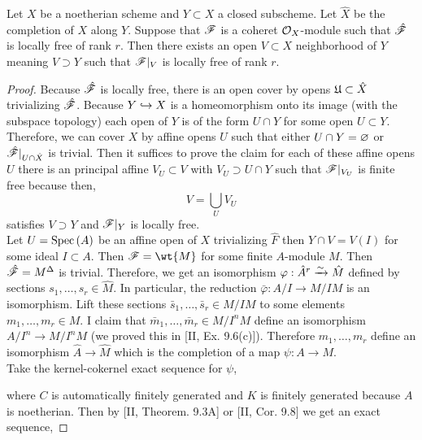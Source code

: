 \documentclass[12pt]{article}
\begin{document}
\begin{enumerate}
\begin{prop}
Let $X$ be a noetherian scheme and $Y \subset X$ a closed subscheme. Let $\hat{X}$ be the completion of $X$ along $Y$. Suppose that $\mathscr{F}$ is a coheret $\mathcal{O}_{X}$-module such that $\hat{\mathscr{F}}$ is locally free of rank $r$. Then there exists an open $V \subset X$ neighborhood of $Y$ meaning $V \supset Y$ such that $\mathscr{F}|_V$ is locally free of rank $r$.
\end{prop}

\begin{proof}
Because $\hat{\mathscr{F}}$ is locally free, there is an open cover by opens $\mathfrak{U} \subset \hat{X}$ trivializing $\hat{\mathscr{F}}$. Because $Y \hookrightarrow X$ is a homeomorphism onto its image (with the subspace topology) each open of $Y$ is of the form $U \cap Y$ for some open $U \subset Y$. Therefore, we can cover $X$ by affine opens $U$ such that either $U \cap Y = \varnothing$ or $\hat{\mathscr{F}} |_{U \cap \hat{X}}$ is trivial. Then it suffices to prove the claim for each of these affine opens $U$ there is an principal affine $V_U \subset V$ with $V_U \supset U \cap Y$ such that $\mathscr{F} |_{V_U}$ is finite free because then,
\[ V = \bigcup_{U} V_U \]
satisfies $V \supset Y$ and $\mathscr{F} |_Y$ is locally free. 
\bigskip\\
Let $U = \mathrm{Spec}\left( A \right)$ be an affine open of $X$ trivializing $\hat{F}$ then $Y \cap V = V(I)$ for some ideal $I \subset A$. Then $\F = \wt{M}$ for some finite $A$-module $M$. Then $\hat{\mathscr{F}} = M^\Delta$ is trivial. Therefore, we get an isomorphism $\varphi : \hat{A}^r \xrightarrow{\sim} \hat{M}$ defined by sections $s_1, \dots, s_r \in \hat{M}$. In particular, the reduction $\bar{\varphi} : A / I \to M / I M$ is an isomorphism. Lift these sections $\bar{s}_1, \dots, \bar{s}_r \in M / I M$ to some elements $m_1, \dots, m_r \in M$. I claim that $\bar{m}_1, \dots, \bar{m}_r \in M / I^n M$ define an isomorphism $A / I^n \to M / I^n M$ (we proved this in [II, Ex. 9.6(c)]). Therefore $m_1, \dots, m_r$ define an isomorphism $\hat{A} \to \hat{M}$ which is the completion of a map $\psi : A \to M$. 
\bigskip\\
Take the kernel-cokernel exact sequence for $\psi$,
\begin{center}
\end{center} 
where $C$ is automatically finitely generated and $K$ is finitely generated because $A$ is noetherian. Then by [II, Theorem. 9.3A] or [II, Cor. 9.8] we get an exact sequence, 

\end{proof}
\end{enumerate}
\end{document}

